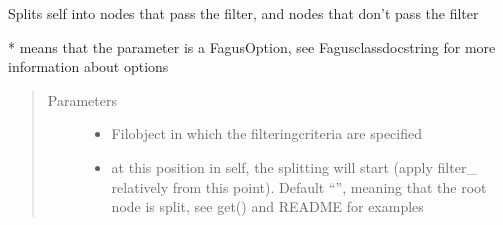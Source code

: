 \documentclass[a4paper,10pt,english]{sphinxmanual}
\begin{document}
\begin{fulllineitems}
\begin{fulllineitems}
\label{\detokenize{fagus.fagus:fagus.fagus.Fagus.split}}
\pysigstartsignatures
{}
\pysigstopsignatures
\sphinxAtStartPar
Splits self into nodes that pass the filter, and nodes that don’t pass the filter

\sphinxAtStartPar
* means that the parameter is a FagusOption, see Fagus\sphinxhyphen{}class\sphinxhyphen{}docstring for more information about options
\begin{quote}\begin{description}
\item[{Parameters}] \leavevmode\begin{itemize}
\item {}
\sphinxAtStartPar
{} \textendash{} Fil\sphinxhyphen{}object in which the filtering\sphinxhyphen{}criteria are specified

\item {}
\sphinxAtStartPar
{} \textendash{} at this position in self, the splitting will start (apply filter\_ relatively from this point).
Default “”, meaning that the root node is split, see get() and README for examples


\end{itemize}
\end{description}
\end{quote}
\end{fulllineitems}
\end{fulllineitems}
\end{document}
